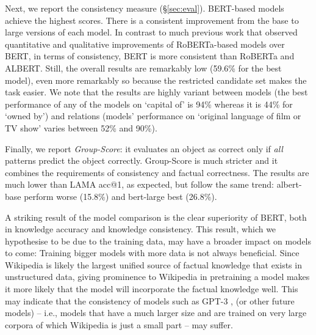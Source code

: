 Next, we report the consistency measure (\S\ref{sec:eval}).
BERT-based models achieve the highest scores. There is a consistent improvement from the {base} to {large} versions of each model.
In contrast to much previous work that observed quantitative and qualitative improvements of RoBERTa-based models over BERT, in terms of consistency, BERT is more consistent than RoBERTa and ALBERT.
Still, the overall results are remarkably low (59.6\% for
the best model), %
even more remarkably so because the restricted candidate set
makes the task easier.
We note that the results are highly variant between models
(the best performance of any of the models on
`capital of' is 94\% whereas it is 44\% for `owned by')
and relations (models' performance on `original language of film or TV show'  varies between 52\% and 90\%).

Finally, we report
\emph{Group-Score}: it evaluates an object as correct only
if \emph{all} patterns predict the object
correctly. Group-Score is much stricter and it combines  the
requirements
of consistency and factual correctness.
The results are much lower than  LAMA acc@1, as expected,
but follow the same trend: albert-base perform worse (15.8\%) and bert-large  best  (26.8\%).






A striking result of the model comparison is
the clear superiority of
BERT, both in knowledge accuracy and knowledge
consistency. This result, which we hypothesise to be due to
the training data, may have a broader impact on models to
come: Training bigger models with more data is not always
beneficial. Since Wikipedia is likely the largest unified source
of factual knowledge that exists in unstructured data,
giving prominence to Wikipedia in pretraining a model makes it more
likely that the model will incorporate the factual knowledge
well. 
This may indicate that  the consistency of models such as GPT-3 \cite{gpt3},
(or other future models) -- i.e., models that
have a much larger size and
are trained on very large corpora of
which Wikipedia is just a small part -- may suffer.

